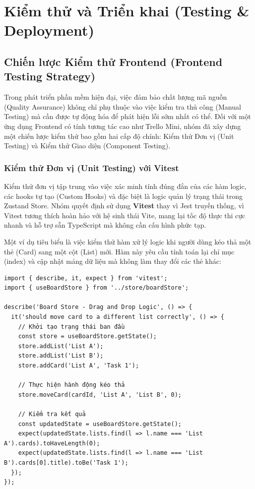 \chapter{Kiểm thử và Triển khai (Testing \& Deployment)}

\section{Chiến lược Kiểm thử Frontend (Frontend Testing Strategy)}
Trong phát triển phần mềm hiện đại, việc đảm bảo chất lượng mã nguồn (Quality Assurance) không chỉ phụ thuộc vào việc kiểm tra thủ công (Manual Testing) mà cần được tự động hóa để phát hiện lỗi sớm nhất có thể. Đối với một ứng dụng Frontend có tính tương tác cao như Trello Mini, nhóm đã xây dựng một chiến lược kiểm thử bao gồm hai cấp độ chính: Kiểm thử Đơn vị (Unit Testing) và Kiểm thử Giao diện (Component Testing).

\subsection{Kiểm thử Đơn vị (Unit Testing) với Vitest}
Kiểm thử đơn vị tập trung vào việc xác minh tính đúng đắn của các hàm logic, các hooks tự tạo (Custom Hooks) và đặc biệt là logic quản lý trạng thái trong Zustand Store. Nhóm quyết định sử dụng \textbf{Vitest} thay vì Jest truyền thống, vì Vitest tương thích hoàn hảo với hệ sinh thái Vite, mang lại tốc độ thực thi cực nhanh và hỗ trợ sẵn TypeScript mà không cần cấu hình phức tạp.

Một ví dụ tiêu biểu là việc kiểm thử hàm xử lý logic khi người dùng kéo thả một thẻ (Card) sang một cột (List) mới. Hàm này yêu cầu tính toán lại chỉ mục (index) và cập nhật mảng dữ liệu mà không làm thay đổi các thẻ khác:

\begin{Verbatim}
import { describe, it, expect } from 'vitest';
import { useBoardStore } from '../store/boardStore';

describe('Board Store - Drag and Drop Logic', () => {
  it('should move card to a different list correctly', () => {
    // Khởi tạo trạng thái ban đầu
    const store = useBoardStore.getState();
    store.addList('List A');
    store.addList('List B');
    store.addCard('List A', 'Task 1');

    // Thực hiện hành động kéo thả
    store.moveCard(cardId, 'List A', 'List B', 0);

    // Kiểm tra kết quả
    const updatedState = useBoardStore.getState();
    expect(updatedState.lists.find(l => l.name === 'List A').cards).toHaveLength(0);
    expect(updatedState.lists.find(l => l.name === 'List B').cards[0].title).toBe('Task 1');
  });
});
\end{Verbatim}

